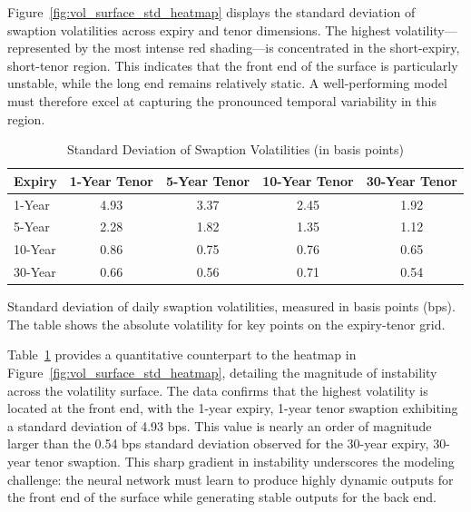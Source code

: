 Figure~\ref{fig:vol_surface_std_heatmap} displays the standard deviation of swaption volatilities across expiry and tenor dimensions. The highest volatility—represented by the most intense red shading—is concentrated in the short-expiry, short-tenor region. This indicates that the front end of the surface is particularly unstable, while the long end remains relatively static. A well-performing model must therefore excel at capturing the pronounced temporal variability in this region.

\begin{table}[H]
	\centering
	\begin{threeparttable}
		\caption{Standard Deviation of Swaption Volatilities (in basis points)}
		\label{tab:vol_std_summary}
		\begin{tabular}{lcccc}
			\toprule
			\textbf{Expiry} & \textbf{1-Year Tenor} & \textbf{5-Year Tenor} & \textbf{10-Year Tenor} & \textbf{30-Year Tenor} \\
			\midrule
			1-Year          & 4.93                  & 3.37                  & 2.45                   & 1.92                   \\
			5-Year          & 2.28                  & 1.82                  & 1.35                   & 1.12                   \\
			10-Year         & 0.86                  & 0.75                  & 0.76                   & 0.65                   \\
			30-Year         & 0.66                  & 0.56                  & 0.71                   & 0.54                   \\
			\bottomrule
		\end{tabular}
		\begin{tablenotes}
			\footnotesize
			\item  Standard deviation of daily swaption volatilities, measured in basis points (bps). The table shows the absolute volatility for key points on the expiry-tenor grid.
		\end{tablenotes}
	\end{threeparttable}
\end{table}


Table~\ref{tab:vol_std_summary} provides a quantitative counterpart to the heatmap in Figure~\ref{fig:vol_surface_std_heatmap}, detailing the magnitude of instability across the volatility surface. The data confirms that the highest volatility is located at the front end, with the 1-year expiry, 1-year tenor swaption exhibiting a standard deviation of 4.93 bps. This value is nearly an order of magnitude larger than the 0.54 bps standard deviation observed for the 30-year expiry, 30-year tenor swaption. This sharp gradient in instability underscores the modeling challenge: the neural network must learn to produce highly dynamic outputs for the front end of the surface while generating stable outputs for the back end.

